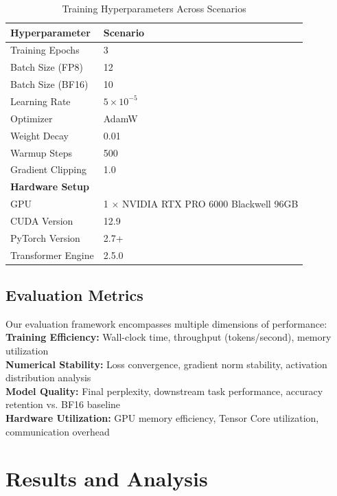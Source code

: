 \documentclass[conference]{IEEEtran}
\begin{document}
\begin{table}[h!]
\centering
\caption{Training Hyperparameters Across Scenarios}
\begin{tabular}{|l|l|}
\hline
\textbf{Hyperparameter} & \textbf{Scenario} \\
\hline
Training Epochs & 3  \\
Batch Size (FP8) & 12 \\
Batch Size (BF16) & 10\\
Learning Rate & $5 \times 10^{-5}$ \\
Optimizer & AdamW  \\
Weight Decay & 0.01  \\
Warmup Steps & 500 \\
Gradient Clipping & 1.0  \\
\hline
\textbf{Hardware Setup} & \multicolumn{1}{l|}{} \\
\hline
GPU & \multicolumn{1}{l|}{1 $\times$ NVIDIA RTX PRO 6000 Blackwell 96GB} \\
CUDA Version & \multicolumn{1}{l|}{12.9} \\
PyTorch Version & \multicolumn{1}{l|}{2.7+} \\
Transformer Engine & \multicolumn{1}{l|}{2.5.0} \\
\hline
\end{tabular}
\label{tab:hyperparameters}
\end{table}

\subsection{Evaluation Metrics}

Our evaluation framework encompasses multiple dimensions of performance:\\
\textbf{Training Efficiency:} Wall-clock time, throughput (tokens/second), memory utilization\\
\textbf{Numerical Stability:} Loss convergence, gradient norm stability, activation distribution analysis\\
\textbf{Model Quality:} Final perplexity, downstream task performance, accuracy retention vs. BF16 baseline\\
\textbf{Hardware Utilization:} GPU memory efficiency, Tensor Core utilization, communication overhead\\

\section{Results and Analysis}
\end{document}
